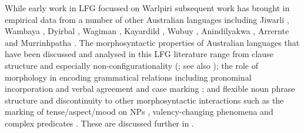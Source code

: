 \documentclass[output=paper,hidelinks]{langscibook}
\begin{document}
While early work in LFG focussed on Warlpiri \citep{Simpson1983,SimpBres1983,Simpson1991} subsequent work has brought in empirical data from a number of other Australian languages including Jiwarli \citep{AustBres96}, Wambaya \citep{NordBres1996,nordlinger1998constructive}, Dyirbal \citep{Manning1996}, Wagiman \citep{Wilson1999}, Kayardild \citep{EvanNord2004}, Wubuy \citep{BakeNord2008,Bakeretal2010}, Anindilyakwa \citep{Egmond2008}, Arrernte \citep{Drasetal2012} and Murrinhpatha \citep{SeisNord2010,Seiss2013}. The morphosyntactic properties of Australian languages that have been discussed and analysed in this LFG literature range from clause structure and especially non-configurationality (\citealt{Simpson1991,AustBres96,NordBres2011,Snijders2015}; see also ); the role of morphology in encoding grammatical relations \citep{NordBres2011,nordlinger1998constructive} including pronominal incorporation and verbal agreement \citep{AustBres96} and case marking \citep{Simpson1991,Andrews1996,nordlinger1998constructive,Andrews2017}; and flexible noun phrase structure and discontinuity \citep{Simpson1991,SadlNord_apposition_2006,SadlNord2010,snijders_lfg_2016} to other morphosyntactic interactions such as the marking of tense{\slash}aspect{\slash}mood on NPs \citep{NordSadlLanguage}, valency-changing phenomena \citep{Austin97,SeisNord2010} and complex predicates \citep{Wilson1999,AndrewsManning1999}.  These are discussed further in .
\end{document}
